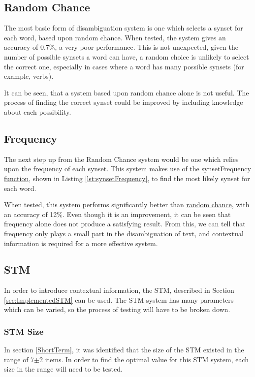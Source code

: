 \documentclass[]{article}
\begin{document}
\subsection{Random Chance}
\label{sec:EvRandomChance}
The most basic form of disambiguation system is one which selects a synset for each word, based upon random chance. When tested, the system gives an accuracy of 0.7\%, a very poor performance. This is not unexpected, given the number of possible synsets a word can have, a random choice is unlikely to select the correct one, especially in cases where a word has many possible synsets (for example, verbs).

It can  be seen, that a system based upon random chance alone is not useful. The process of finding the correct synset could be improved by including knowledge about each possibility.

\subsection{Frequency}
\label{sec:EvFrequency}
The next step up from the Random Chance system would be one which relies upon the frequency of each synset. This system makes use of the \hyperref[lst:synsetFrequency]{synsetFrequency function}, shown in Listing \ref{lst:synsetFrequency}, to find the most likely synset for each word.

When tested, this system performs significantly better than \hyperref[sec:EvFrequency]{random chance}, with an accuracy of 12\%. Even though it is an improvement, it can be seen that frequency alone does not produce a satisfying result. From this, we can tell that frequency only plays a small part in the disambiguation of text, and contextual information is required for a more effective system.

\subsection{STM}
\label{sec:EvSTM}
In order to introduce contextual information, the STM, described in Section \ref{sec:ImplementedSTM} can be used. The STM system has many parameters which can be varied, so the process of testing will have to be broken down.

\subsubsection{STM Size}
\label{sec:EvSTMSize}
In section \ref{ShortTerm}, it was identified that the size of the STM existed in the range of 7$\pm$2 items. In order to find the optimal value for this STM system, each size in the range will need to be tested.
\end{document}
